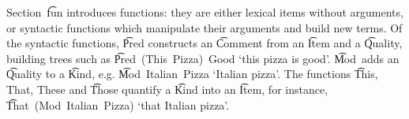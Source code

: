 Section~\t{fun} introduces functions: they are either lexical
items without arguments, or syntactic functions which manipulate their
arguments and build new terms. Of the syntactic functions, \t{Pred}
constructs an \t{Comment} from an \t{Item} and a \t{Quality},
building trees such as \t{Pred~(This~Pizza)~Good} `this pizza is
good'. 
\t{Mod}~adds an \t{Quality} to a \t{Kind}, e.g. \t{Mod~Italian~Pizza}
`Italian pizza'. The functions  \t{This, That, These} 
and \t{Those} quantify a \t{Kind} into an \t{Item}, for instance,
\t{That~(Mod~Italian~Pizza)} `that Italian pizza'.

\begin{figure}[h]
\centering
\begin{Shaded}
\begin{Highlighting}[]
   \FunctionTok{=} \NormalTok{\{}
     \FunctionTok{=}  \NormalTok{;}
     \FunctionTok{=} \OtherTok{:}  \OtherTok{:}  \OtherTok{:}  \NormalTok{\} ;}
     \FunctionTok{=} \OtherTok{:}  \OtherTok{=>}  \OtherTok{:}  \NormalTok{\} ;}
     \FunctionTok{=} \OtherTok{:}  \OtherTok{=>}  \OtherTok{=>}  \OtherTok{:}  \NormalTok{\} ;}
     \FunctionTok{=} \FunctionTok{++} \FunctionTok{!} \FunctionTok{++} \FunctionTok{!} \FunctionTok{!} 
     \FunctionTok{=}    
     \FunctionTok{=}    
     \FunctionTok{=} \FunctionTok{=} \OtherTok{=>} \FunctionTok{!} \FunctionTok{!} \FunctionTok{!} 

\end{Highlighting}
\end{Shaded}
\end{figure}
